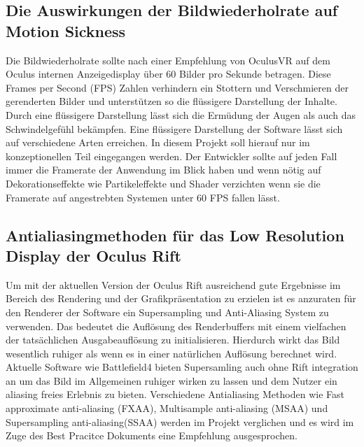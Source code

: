 \documentclass[pagesize, paper=a4, fontsize=12pt,titlepage=true, headings=small, headnosepline, abstractoff, liststotoc, nochapterprefix, plainheadsepline, twoside]{scrreprt}
\begin{document}
\subsection{Die Auswirkungen der Bildwiederholrate auf Motion Sickness}
Die Bildwiederholrate sollte nach einer Empfehlung von OculusVR auf dem Oculus internen Anzeigedisplay über 60 Bilder pro Sekunde betragen. Diese Frames per Second (FPS) Zahlen verhindern ein Stottern und Verschmieren der gerenderten Bilder und unterstützen so die flüssigere Darstellung der Inhalte. Durch eine flüssigere Darstellung lässt sich die Ermüdung der Augen als auch das Schwindelgefühl bekämpfen. Eine flüssigere Darstellung der Software lässt sich auf verschiedene Arten erreichen. In diesem Projekt soll hierauf nur im konzeptionellen Teil eingegangen werden. Der Entwickler sollte auf jeden Fall immer die Framerate der Anwendung im Blick haben und wenn nötig auf Dekorationseffekte wie Partikeleffekte und Shader verzichten wenn sie die Framerate auf angestrebten Systemen unter 60 FPS fallen lässt.

\subsection{Antialiasingmethoden für das Low Resolution Display der Oculus Rift}
Um mit der aktuellen Version der Oculus Rift ausreichend gute Ergebnisse im Bereich des Rendering und der Grafikpräsentation zu erzielen ist es anzuraten für den Renderer der Software ein Supersampling und Anti-Aliasing System zu verwenden. Das bedeutet die Auflösung des Renderbuffers mit einem vielfachen der tatsächlichen Ausgabeauflösung zu initialisieren. Hierdurch wirkt das Bild wesentlich ruhiger als wenn es in einer natürlichen Auflösung berechnet wird. Aktuelle Software wie Battlefield4 \cite{Battlefield42014} bieten Supersamling auch ohne Rift integration an um das Bild im Allgemeinen ruhiger wirken zu lassen und dem Nutzer ein aliasing freies Erlebnis zu bieten. Verschiedene Antialiasing Methoden wie Fast approximate anti-aliasing (FXAA), Multisample anti-aliasing (MSAA) und Supersampling anti-aliasing(SSAA) werden im Projekt verglichen und es wird im Zuge des Best Pracitce Dokuments eine Empfehlung ausgesprochen.
\end{document}
